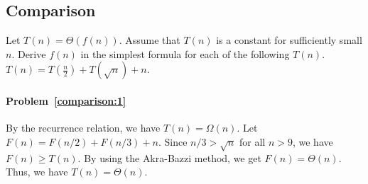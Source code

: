 \subsection{Comparison}
\begin{Exercise}[origin={NCTU BIOINFO 93},difficulty=1]
Let $T(n) = \Theta(f(n))$. Assume that $T(n)$ is a constant for sufficiently small $n$. Derive $f(n)$ in the simplest formula for each of the following $T(n)$.
\Question $T(n) = T(\frac{n}{2}) + T(\sqrt{n}) + n$. \label{comparison:1} 
\end{Exercise}
\begin{Answer}

\paragraph{Problem~\ref{comparison:1}}
By the recurrence relation, we have $T(n) = \Omega(n)$. Let $F(n) = F(n/2) + F(n/3) + n$. Since $n/3 >  \sqrt{n}$ for all $n > 9$, we have $F(n) \geq T(n)$.
By using the Akra\--Bazzi method, we get $F(n) = \Theta(n)$.
Thus, we have $T(n) = \Theta(n)$.
\end{Answer}

\printbibliography[heading=subbibliography]
